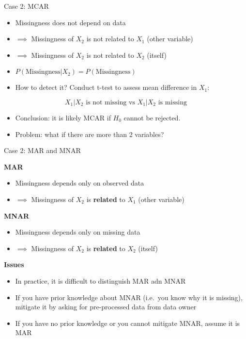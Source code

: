 \documentclass[ignorenonframetext,]{beamer}
\providecommand{\tightlist}{%
  \setlength{\itemsep}{0pt}\setlength{\parskip}{0pt}}
\begin{document}
\begin{frame}{Case 2: MCAR}

\begin{itemize}[<+->]
\tightlist
\item
  Missingness does not depend on data
\item
  \(\implies\) Missingness of \(X_{2}\) is not related to \(X_{1}\)
  (other variable)
\item
  \(\implies\) Missingness of \(X_{2}\) is not related to \(X_{2}\)
  (itself)
\item
  \(P(\text{Missingness}|X_{2}) = P(\text{Missingness})\)
\item
  How to detect it? Conduct t-test to assess mean difference in
  \(X_{1}\):
\end{itemize}

\[X_{1} | X_{2} \text{ is not missing vs } X_{1} | X_{2} \text{ is  missing}\]

\begin{itemize}[<+->]
\tightlist
\item
  Conclusion: it is likely MCAR if \(H_0\) cannot be rejected.
\item
  Problem: what if there are more than 2 variables?
\end{itemize}

\end{frame}

\begin{frame}{Case 2: MAR and MNAR}

\textbf{MAR}

\begin{itemize}[<+->]
\tightlist
\item
  Missingness depends only on observed data
\item
  \(\implies\) Missingness of \(X_{2}\) is \textbf{related} to \(X_{1}\)
  (other variable)
\end{itemize}

\textbf{MNAR}

\begin{itemize}[<+->]
\tightlist
\item
  Missingness depends only on missing data
\item
  \(\implies\) Missingness of \(X_{2}\) is \textbf{related} to \(X_{2}\)
  (itself)
\end{itemize}

\textbf{Issues}

\begin{itemize}[<+->]
\tightlist
\item
  In practice, it is difficult to distinguish MAR adn MNAR
\item
  If you have prior knowledge about MNAR (i.e.~you know why it is
  missing), mitigate it by asking for pre-processed data from data owner
\item
  If you have no prior knowledge or you cannot mitigate MNAR, assume it
  is MAR
\end{itemize}

\end{frame}
\end{document}
